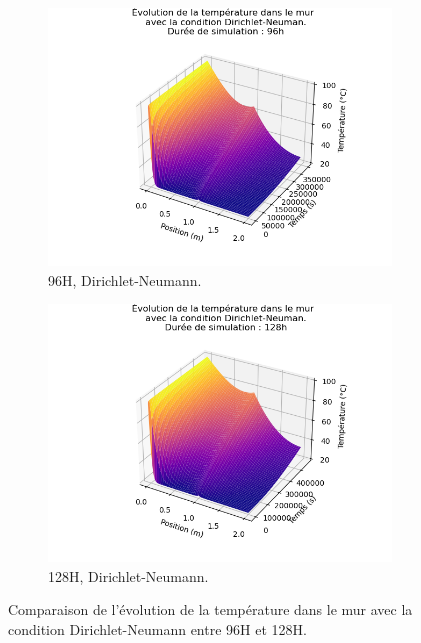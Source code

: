 \documentclass[a4paper,11pt]{article}
\begin{document}
\begin{figure}[!ht]
    \centering
    \begin{subfigure}{0.45\textwidth}
        \centering
        \includegraphics[width=\textwidth]{img/Figure_DN_3D.png} %
        \caption{96H, Dirichlet-Neumann.}
        \label{fig:jalon2_dirichlet_neumann_96H}
    \end{subfigure}
    \hfill
    \begin{subfigure}{0.45\textwidth}
        \centering
        \includegraphics[width=\textwidth]{img/Figure_DN_3D_128.png} %
        \caption{128H, Dirichlet-Neumann.}
        \label{fig:jalon2_dirichlet_neumann_128H}
    \end{subfigure}
    \caption{Comparaison de l'évolution de la température dans le mur avec la condition Dirichlet-Neumann entre 96H et 128H.}
    \label{fig:jalon2_comparaison_dirichlet_neumann}
\end{figure}
\end{document}
